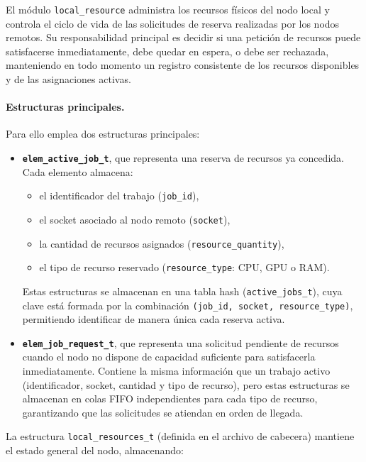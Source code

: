 \documentclass[12pt,a4paper]{article}
\begin{document}
El módulo \texttt{local\_resource} administra los recursos físicos del nodo local y controla el ciclo de vida de las solicitudes de reserva realizadas por los nodos remotos. Su responsabilidad principal es decidir si una petición de recursos puede satisfacerse inmediatamente, debe quedar en espera, o debe ser rechazada, manteniendo en todo momento un registro consistente de los recursos disponibles y de las asignaciones activas.
 
\paragraph{Estructuras principales.}
Para ello emplea dos estructuras principales:
 
\begin{itemize}
    \item \textbf{\texttt{elem\_active\_job\_t}}, que representa una reserva de recursos ya concedida. Cada elemento almacena:
    \begin{itemize}
        \item el identificador del trabajo (\texttt{job\_id}),
        \item el socket asociado al nodo remoto (\texttt{socket}),
        \item la cantidad de recursos asignados (\texttt{resource\_quantity}),
        \item el tipo de recurso reservado (\texttt{resource\_type}: CPU, GPU o RAM).
    \end{itemize}
 
    Estas estructuras se almacenan en una tabla hash (\texttt{active\_jobs\_t}), cuya clave está formada por la combinación \texttt{(job\_id, socket, resource\_type)}, permitiendo identificar de manera única cada reserva activa.
 
    \item \textbf{\texttt{elem\_job\_request\_t}}, que representa una solicitud pendiente de recursos cuando el nodo no dispone de capacidad suficiente para satisfacerla inmediatamente. Contiene la misma información que un trabajo activo (identificador, socket, cantidad y tipo de recurso), pero estas estructuras se almacenan en colas FIFO independientes para cada tipo de recurso, garantizando que las solicitudes se atiendan en orden de llegada.
\end{itemize}
 
La estructura \texttt{local\_resources\_t} (definida en el archivo de cabecera) mantiene el estado general del nodo, almacenando:
 
\end{document}
